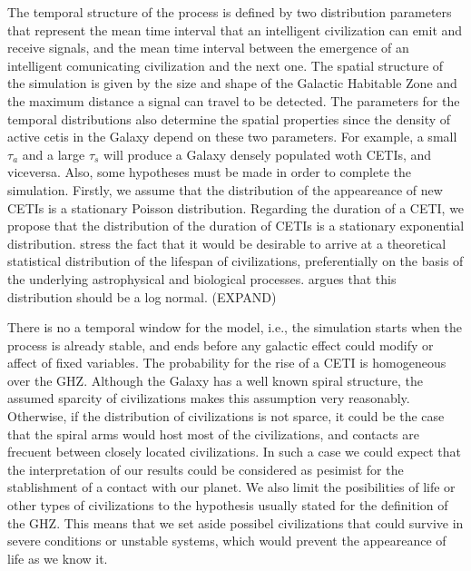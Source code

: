 \documentclass[crop]{CSLB}%
\begin{document}
The temporal structure of the process is defined by two distribution
parameters that represent the mean time interval that an intelligent
civilization can emit and receive signals, and the mean time interval
between the emergence of an intelligent comunicating civilization and
the next one.
%
The spatial structure of the simulation is given by the size and shape
of the Galactic Habitable Zone and the maximum distance a signal can
travel to be detected.
%
The parameters for the temporal distributions also determine the
spatial properties since the density of active cetis in the Galaxy
depend on these two parameters.
%
For example, a small $\tau_a$ and a large $\tau_s$ will produce a
Galaxy densely populated woth CETIs, and viceversa.
%
Also, some hypotheses must be made in order to complete the
simulation.
%
Firstly, we assume that the distribution of the appeareance of new
CETIs is a stationary Poisson distribution.
%
Regarding the duration of a CETI, we propose that the distribution of
the duration of CETIs is a stationary exponential distribution.
%
\citet{Balbi2018} stress the fact that it would be desirable to arrive
at a theoretical statistical distribution of the lifespan of
civilizations, preferentially on the basis of the underlying
astrophysical and biological processes.
%
\citet{Maccone} argues that this distribution should be a log normal.
(EXPAND)




There is no a temporal window for the model, i.e., the simulation
starts when the process is already stable, and ends before any
galactic effect could modify or affect of fixed variables.
%
The probability for the rise of a CETI is homogeneous over the GHZ.
%
Although the Galaxy has a well known spiral structure, the assumed
sparcity of civilizations makes this assumption very reasonably.
%
Otherwise, if the distribution of civilizations is not sparce, it
could be the case that the spiral arms would host most of the
civilizations, and contacts are frecuent between closely located
civilizations.
%
In such a case we could expect that the interpretation of our results
could be considered as pesimist for the stablishment of a contact with
our planet.
%
We also limit the posibilities of life or other types of civilizations
to the hypothesis usually stated for the definition of the GHZ.
%
This means that we set aside possibel civilizations that could survive
in severe conditions or unstable systems, which would prevent the
appeareance of life as we know it.
\end{document}
